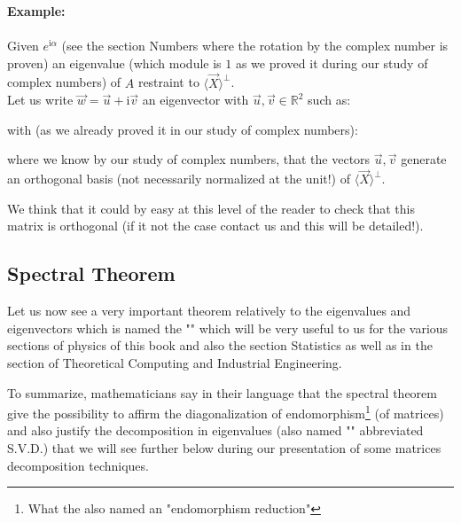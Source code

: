 	\begin{tcolorbox}[colframe=black,colback=white,sharp corners]
	\textbf{{\Large {}}Example:}\\\\
	Given $e^{\mathrm{i}\alpha}$ (see the section Numbers where the rotation by the complex number is proven) an eigenvalue (which module is $1$ as we proved it during our study of complex numbers) of $A$ restraint to $\langle \vec{X} \rangle^\perp$.\\
	
	Let us write $\vec{w}=\vec{u}+\mathrm{i}\vec{v}$ an eigenvector with $\vec{u},\vec{v}\in \mathbb{R}^2$ such as:
	
	with (as we already proved it in our study of complex numbers):
	
	where we know by our study of complex numbers, that the vectors $\vec{u},\vec{v}$ generate an orthogonal basis (not necessarily normalized at the unit!) of $\langle \vec{X} \rangle^\perp$.
	\begin{tcolorbox}[title=Remark,colframe=black,arc=10pt]
	We think that it could by easy at this level of the reader to check that this matrix is orthogonal (if it not the case contact us and this will be detailed!).
	\end{tcolorbox}
	\end{tcolorbox}
	
	\pagebreak
	\subsection{Spectral Theorem}\label{spectral theorem}
	Let us now see a very important theorem relatively to the eigenvalues and eigenvectors which is named the "" which will be very useful to us for the various sections of physics of this book and also the section  Statistics as well as in the section of Theoretical Computing and Industrial Engineering.
	
	To summarize, mathematicians say in their language that the spectral theorem give the possibility to affirm the diagonalization  of endomorphism\footnote{What the also named an "endomorphism reduction"} (of matrices) and also justify the decomposition in eigenvalues (also named "" abbreviated S.V.D.) that we will see further below during our presentation of some matrices decomposition techniques.
	
